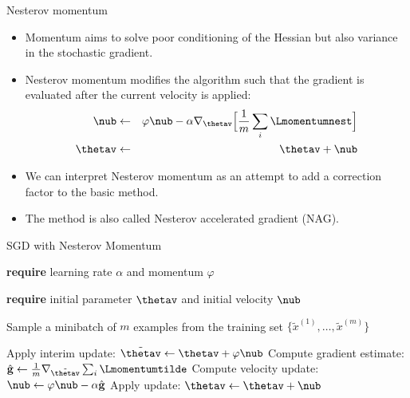 \documentclass[11pt,compress,t,notes=noshow, xcolor=table]{beamer}
\begin{document}
\begin{vbframe}{Nesterov momentum}
  \begin{itemize}
    \item Momentum aims to solve poor conditioning of the Hessian but also variance in the stochastic gradient.
    \item Nesterov momentum modifies the algorithm such that the gradient is evaluated after the current velocity is applied:
      \begin{eqnarray*} 
        \nub &\leftarrow& \varphi \nub - \alpha \nabla_{\thetav} \Big[\frac{1}{m} \sum_{i} \Lmomentumnest \Big] \\
        \thetav &\leftarrow& \thetav + \nub
      \end{eqnarray*}
    \item We can interpret Nesterov momentum as an attempt to add a correction factor to the basic method.
    \item The method is also called Nesterov accelerated gradient (NAG).
  \end{itemize}
\end{vbframe}

\begin{vbframe}{SGD with Nesterov Momentum}
  \begin{algorithm}[H]
  \small
    \caption{Stochastic gradient descent with Nesterov momentum}
    \begin{algorithmic}[1]
    \State \textbf{require} learning rate $\alpha$ and momentum $\varphi$ \strut
    \State \textbf{require} initial parameter $\thetav$ and initial velocity $\nub$ \strut
        \State \parbox[t]{\dimexpr\linewidth-\algorithmicindent}{Sample a minibatch of $m$ examples from the training set $\{\tilde{x}^{(1)},\dots,\tilde{x}^{(m)}\}$}
        \State Apply interim update: $\tilde{\thetav} \leftarrow \thetav + \varphi \nub$
        \State Compute gradient estimate: $\hat{\mathbf{g}} \leftarrow  \frac{1}{m} \nabla_{\tilde{\thetav}} \sum_{i} \Lmomentumtilde$
        \State Compute velocity update: $\nub \leftarrow \varphi \nub - \alpha \hat{\mathbf{g}}$
        \State Apply update: $\thetav \leftarrow \thetav + \nub$
      \EndWhile
    \end{algorithmic}
  \end{algorithm}
\end{vbframe}
\end{document}
